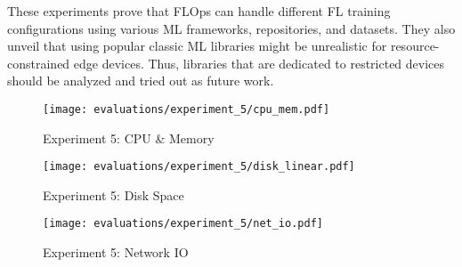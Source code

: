 These experiments prove that FLOps can handle different FL training configurations using various ML frameworks, repositories, and datasets.
They also unveil that using popular classic ML libraries might be unrealistic for resource-constrained edge devices.
Thus, libraries that are dedicated to restricted devices should be analyzed and tried out as future work.


\begin{figure}[p]
    \begin{adjustwidth}{-0.2\paperwidth}{-0.2\paperwidth}
        \centering
        \texttt{[image: evaluations/experiment\_5/cpu\_mem.pdf]}
        \caption{Experiment 5: CPU \& Memory}
        \label{fig:eval_5_cpu_mem}
    \end{adjustwidth}

    \begin{adjustwidth}{-0.2\paperwidth}{-0.2\paperwidth}
        \centering
        \texttt{[image: evaluations/experiment\_5/disk\_linear.pdf]}
        \caption{Experiment 5: Disk Space}
        \label{fig:eval_5_disk_space}
    \end{adjustwidth}

    \begin{adjustwidth}{-0.2\paperwidth}{-0.2\paperwidth}
        \centering
        \texttt{[image: evaluations/experiment\_5/net\_io.pdf]}
        \caption{Experiment 5: Network IO}
        \label{fig:eval_5_net_io}
    \end{adjustwidth}
\end{figure}

